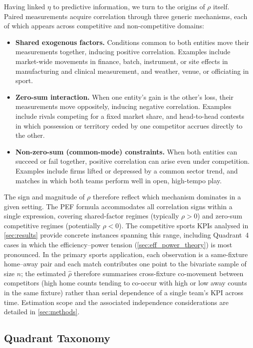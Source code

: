 Having linked $\eta$ to predictive information, we turn to the origins of $\rho$ itself. Paired measurements acquire correlation through three generic mechanisms, each of which appears across competitive and non-competitive domains:
\begin{itemize}
  \item \textbf{Shared exogenous factors.} Conditions common to both entities move their measurements together, inducing positive correlation. Examples include market-wide movements in finance, batch, instrument, or site effects in manufacturing and clinical measurement, and weather, venue, or officiating in sport.
  \item \textbf{Zero-sum interaction.} When one entity's gain is the other's loss, their measurements move oppositely, inducing negative correlation. Examples include rivals competing for a fixed market share, and head-to-head contests in which possession or territory ceded by one competitor accrues directly to the other.
  \item \textbf{Non-zero-sum (common-mode) constraints.} When both entities can succeed or fail together, positive correlation can arise even under competition. Examples include firms lifted or depressed by a common sector trend, and matches in which both teams perform well in open, high-tempo play.
\end{itemize}
The sign and magnitude of $\rho$ therefore reflect which mechanism dominates in a given setting. The PEF formula accommodates all correlation signs within a single expression, covering shared-factor regimes (typically $\rho>0$) and zero-sum competitive regimes (potentially $\rho<0$). The competitive sports KPIs analysed in \cref{sec:results} provide concrete instances spanning this range, including Quadrant~4 cases in which the efficiency--power tension (\cref{sec:eff_power_theory}) is most pronounced. In the primary sports application, each observation is a same-fixture home--away pair and each match contributes one point to the bivariate sample of size $n$; the estimated $\hat\rho$ therefore summarises cross-fixture co-movement between competitors (high home counts tending to co-occur with high or low away counts in the same fixture) rather than serial dependence of a single team's KPI across time. Estimation scope and the associated independence considerations are detailed in \cref{sec:methods}.

\subsection{Quadrant Taxonomy}

